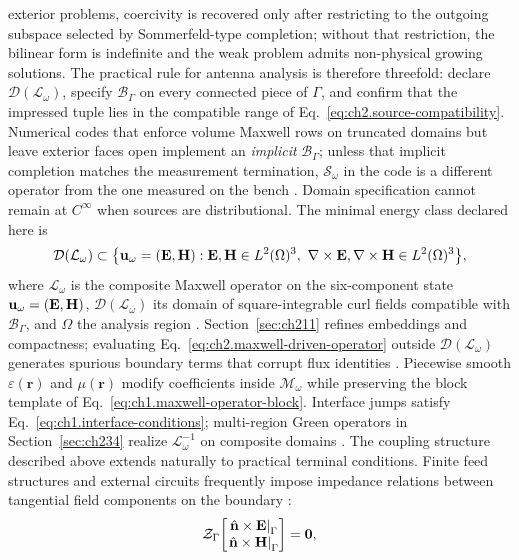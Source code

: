 exterior problems, coercivity is recovered only after restricting to the
outgoing subspace selected by Sommerfeld-type completion; without that restriction,
the bilinear form is indefinite and the weak problem admits non-physical
growing solutions. The practical rule for antenna analysis is therefore
threefold: declare \(\mathcal{D}(\mathcal{L}_\omega)\), specify
\(\mathcal{B}_\Gamma\) on every connected piece of \(\Gamma\), and confirm that
the impressed tuple lies in the compatible range of
Eq.~\eqref{eq:ch2.source-compatibility}. Numerical codes that enforce volume
Maxwell rows on truncated domains but leave exterior faces open implement an
\emph{implicit} \(\mathcal{B}_\Gamma\); unless that implicit completion matches
the measurement termination, \(\mathcal{S}_\omega\) in the code is a different
operator from the one measured on the bench \cite{harrington2001}. Domain specification cannot remain at \(C^\infty\) when sources are distributional.
The minimal energy class declared here is
\begin{equation}
\label{eq:ch2.operator-domain-declaration}
\mathcal{D}(\mathcal{L}_\omega)\subset
\big\{\mathbf{u}_\omega=(\mathbf{E},\mathbf{H}):
\mathbf{E},\mathbf{H}\in L^{2}(\Omega)^{3},\ \nabla\times\mathbf{E},\nabla\times\mathbf{H}\in L^{2}(\Omega)^{3}\big\},
\end{equation}
where $\mathcal{L}_\omega$ is the composite Maxwell operator on the six-component state
$\mathbf{u}_\omega=(\mathbf{E},\mathbf{H})$, $\mathcal{D}(\mathcal{L}_\omega)$ its domain of square-integrable
curl fields compatible with $\mathcal{B}_\Gamma$, and $\Omega$ the analysis region
\cite{stratton1941}. Section~\ref{sec:ch211} refines embeddings and compactness; evaluating
Eq.~\eqref{eq:ch2.maxwell-driven-operator} outside
\(\mathcal{D}(\mathcal{L}_\omega)\) generates spurious boundary terms that corrupt
flux identities \cite{stratton1941}.
Piecewise smooth \(\varepsilon(\mathbf{r})\) and \(\mu(\mathbf{r})\) modify
coefficients inside \(\mathcal{M}_\omega\) while preserving the block template of
Eq.~\eqref{eq:ch1.maxwell-operator-block}. Interface jumps satisfy
Eq.~\eqref{eq:ch1.interface-conditions}; multi-region Green operators in
Section~\ref{sec:ch234} realize \(\mathcal{L}_\omega^{-1}\) on composite domains
\cite{stratton1941}. The coupling structure described above extends naturally to practical
terminal conditions. Finite feed structures and external circuits frequently impose
impedance relations between tangential field components on the boundary
\cite{harrington2001}:
\begin{equation}
\label{eq:ch2.boundary-impedance-operator}
\mathcal{Z}_\Gamma\!
\begin{bmatrix}
\left.\hat{\mathbf{n}}\times\mathbf{E}\right|_{\Gamma}\\
\left.\hat{\mathbf{n}}\times\mathbf{H}\right|_{\Gamma}
\end{bmatrix}=\mathbf{0},
\end{equation}
